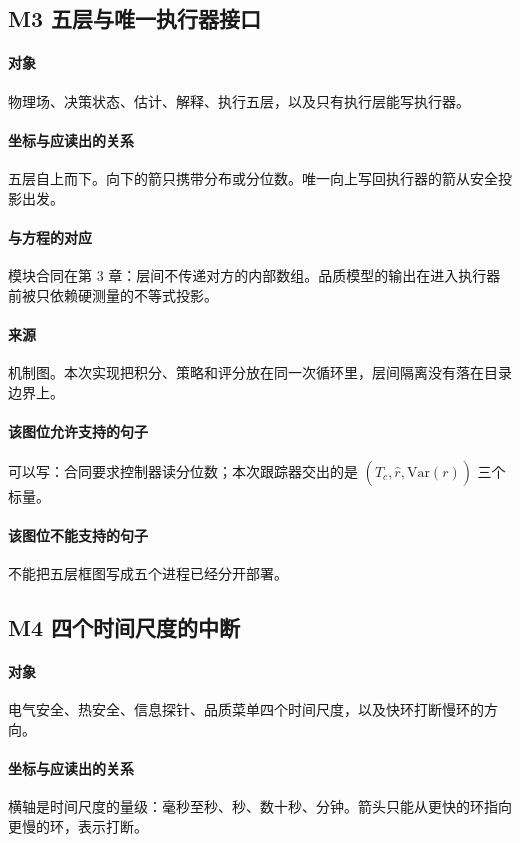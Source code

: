 \subsection{M3 五层与唯一执行器接口}
\paragraph{对象}
物理场、决策状态、估计、解释、执行五层，以及只有执行层能写执行器。

\paragraph{坐标与应读出的关系}
五层自上而下。向下的箭只携带分布或分位数。唯一向上写回执行器的箭从安全投影出发。

\paragraph{与方程的对应}
模块合同在第 3 章：层间不传递对方的内部数组。品质模型的输出在进入执行器前被只依赖硬测量的不等式投影。

\paragraph{来源}
机制图。本次实现把积分、策略和评分放在同一次循环里，层间隔离没有落在目录边界上。

\paragraph{该图位允许支持的句子}
可以写：合同要求控制器读分位数；本次跟踪器交出的是 $(\hat T_c,\hat r,\mathrm{Var}(r))$ 三个标量。

\paragraph{该图位不能支持的句子}
不能把五层框图写成五个进程已经分开部署。

\subsection{M4 四个时间尺度的中断}
\paragraph{对象}
电气安全、热安全、信息探针、品质菜单四个时间尺度，以及快环打断慢环的方向。

\paragraph{坐标与应读出的关系}
横轴是时间尺度的量级：毫秒至秒、秒、数十秒、分钟。箭头只能从更快的环指向更慢的环，表示打断。

